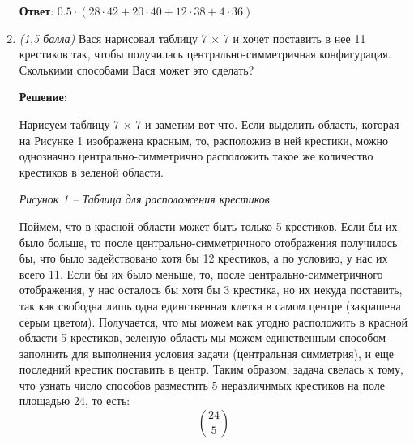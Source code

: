 \documentclass{article}
\begin{document}
\begin{enumerate}
        \textbf{Ответ}:
        $0.5\cdot(28\cdot42+20\cdot40+12\cdot38+4\cdot36)$

        \item \textit{(1,5 балла)} Вася нарисовал таблицу 7 × 7 и хочет поставить в нее 11 крестиков так, чтобы получилась центрально-симметричная конфигурация. Сколькими способами Вася может это сделать?
        
        \textbf{Решение}:

        Нарисуем таблицу 7 × 7 и заметим вот что. Если выделить область, которая на Рисунке 1 изображена красным, то, расположив в ней крестики, можно однозначно центрально-симметрично расположить такое же количество крестиков в зеленой области.
        \begin{center}
    
            \textit{Рисунок 1 -- Таблица для расположения крестиков}
        \end{center}
        Поймем, что в красной области может быть только 5 крестиков. Если бы их было больше, то после центрально-симметричного отображения получилось бы, что было задействовано хотя бы 12 крестиков, а по условию, у нас их всего 11. Если бы их было меньше, то, после центрально-симметричного отображения, у нас осталось бы хотя бы 3 крестика, но их некуда поставить, так как свободна лишь одна единственная клетка в самом центре (закрашена серым цветом). Получается, что мы можем как угодно расположить в красной области 5 крестиков, зеленую область мы можем единственным способом заполнить для выполнения условия задачи (центральная симметрия), и еще последний крестик поставить в центр. Таким образом, задача свелась к тому, что узнать число способов разместить 5 неразличимых крестиков на поле площадью 24, то есть:
        \begin{equation}
            \binom{24}{5}
        \end{equation}


\end{enumerate}
\end{document}
